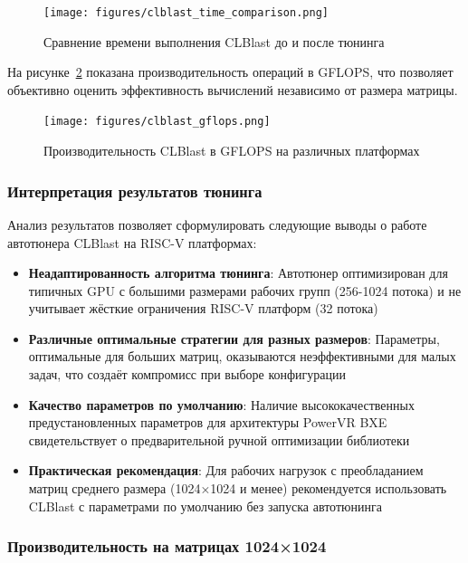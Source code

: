 \begin{figure}[h!]
\centering
\texttt{[image: figures/clblast\_time\_comparison.png]}
\caption{Сравнение времени выполнения CLBlast до и после тюнинга}
\label{fig:clblast_time}
\end{figure}

На рисунке~\ref{fig:clblast_gflops} показана производительность операций в GFLOPS, что позволяет объективно оценить эффективность вычислений независимо от размера матрицы.

\begin{figure}[h!]
\centering
\texttt{[image: figures/clblast\_gflops.png]}
\caption{Производительность CLBlast в GFLOPS на различных платформах}
\label{fig:clblast_gflops}
\end{figure}

\subsubsection{Интерпретация результатов тюнинга}

Анализ результатов позволяет сформулировать следующие выводы о работе автотюнера CLBlast на RISC-V платформах:

\begin{itemize}
    \item \textbf{Неадаптированность алгоритма тюнинга}: Автотюнер оптимизирован для типичных GPU с большими размерами рабочих групп (256-1024 потока) и не учитывает жёсткие ограничения RISC-V платформ (32 потока)
    
    \item \textbf{Различные оптимальные стратегии для разных размеров}: Параметры, оптимальные для больших матриц, оказываются неэффективными для малых задач, что создаёт компромисс при выборе конфигурации
    
    \item \textbf{Качество параметров по умолчанию}: Наличие высококачественных предустановленных параметров для архитектуры PowerVR BXE свидетельствует о предварительной ручной оптимизации библиотеки
    
    \item \textbf{Практическая рекомендация}: Для рабочих нагрузок с преобладанием матриц среднего размера (1024×1024 и менее) рекомендуется использовать CLBlast с параметрами по умолчанию без запуска автотюнинга
\end{itemize}

\subsubsection{Производительность на матрицах 1024×1024}

